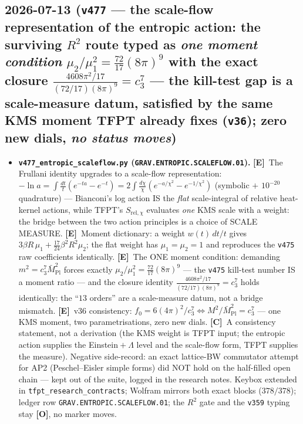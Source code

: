 \documentclass[11pt]{article}
\providecommand{\mE}{\textbf{[E]}}\providecommand{\mC}{\textbf{[C]}}
\providecommand{\mO}{\textbf{[O]}}\providecommand{\mX}{\textbf{[X]}}
\providecommand{\cthree}{c_3}\providecommand{\phiz}{\varphi_0^{\mathrm{ret}}}
\providecommand{\Mbar}{\bar M_{\mathrm{Pl}}}\providecommand{\Z}{\mathbb{Z}}\providecommand{\PP}{\mathbb{P}}
\begin{document}
\subsection*{2026-07-13 (\texttt{v477} --- the scale-flow representation of the entropic action: the surviving $R^2$ route typed as \emph{one moment condition} $\mu_2/\mu_1^2=\tfrac{72}{17}(8\pi)^9$ with the exact closure $\tfrac{4608\pi^2/17}{(72/17)(8\pi)^9}=\cthree^7$ --- the kill-test gap is a scale-measure datum, satisfied by the same KMS moment TFPT already fixes (\texttt{v36}); zero new dials, \emph{no status moves})}
\begin{itemize}[leftmargin=1.5em]
\item \textbf{\texttt{v477\_entropic\_scaleflow.py} (\texttt{GRAV.ENTROPIC.SCALEFLOW.01}).} \mE\ The
Frullani identity upgrades to a scale-flow representation: $-\ln a=\int\tfrac{dt}t(e^{-ta}{-}e^{-t})
=2\int\tfrac{d\chi}\chi(e^{-a/\chi^2}{-}e^{-1/\chi^2})$ (symbolic $+$ $10^{-20}$ quadrature) ---
Bianconi's log action IS the \emph{flat} scale-integral of relative heat-kernel actions, while TFPT's
$S_{\mathrm{rel},\chi}$ evaluates \emph{one} KMS scale with a weight: the bridge between the two action
principles is a choice of SCALE MEASURE. \mE\ Moment dictionary: a weight $w(t)\,dt/t$ gives
$3\beta R\,\mu_1+\tfrac{17}{24}\beta^2R^2\mu_2$; the flat weight has $\mu_1{=}\mu_2{=}1$ and reproduces
the \texttt{v475} raw coefficients identically. \mE\ The ONE moment condition: demanding
$m^2{=}\cthree^7\Mbar^2$ forces exactly $\mu_2/\mu_1^2{=}\tfrac{72}{17}(8\pi)^9$ --- the \texttt{v475}
kill-test number IS a moment ratio --- and the closure identity $\tfrac{4608\pi^2/17}{(72/17)(8\pi)^9}
{=}\cthree^7$ holds identically: the ``$13$ orders'' are a scale-measure datum, not a bridge mismatch.
\mE\ v36 consistency: $f_0{=}6(4\pi)^2/\cthree^7\Leftrightarrow M^2/\Mbar^2{=}\cthree^7$ --- one KMS
moment, two parametrisations, zero new dials. \mC\ A consistency statement, not a derivation (the KMS
weight is TFPT input; the entropic action supplies the Einstein${}+\Lambda$ level and the scale-flow
form, TFPT supplies the measure). Negative side-record: an exact lattice-BW commutator attempt for AP2
(Peschel--Eisler simple forms) did NOT hold on the half-filled open chain --- kept out of the suite,
logged in the research notes. Keybox extended in \texttt{tfpt\_research\_contracts}; Wolfram mirrors
both exact blocks ($378/378$); ledger row \texttt{GRAV.ENTROPIC.SCALEFLOW.01}; the $R^2$ gate and the
\texttt{v359} typing stay \mO, no marker moves.
\end{itemize}
\end{document}
